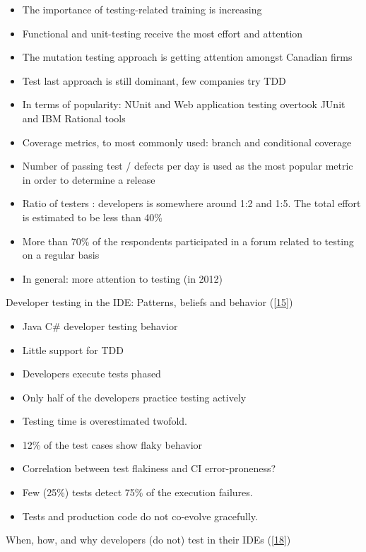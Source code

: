 \documentclass[]{book}
\providecommand{\tightlist}{%
  \setlength{\itemsep}{0pt}\setlength{\parskip}{0pt}}
\begin{document}
\begin{itemize}
\tightlist
\item
  The importance of testing-related training is increasing
\item
  Functional and unit-testing receive the most effort and attention
\item
  The mutation testing approach is getting attention amongst Canadian
  firms
\item
  Test last approach is still dominant, few companies try TDD
\item
  In terms of popularity: NUnit and Web application testing overtook
  JUnit and IBM Rational tools
\item
  Coverage metrics, to most commonly used: branch and conditional
  coverage
\item
  Number of passing test / defects per day is used as the most popular
  metric in order to determine a release
\item
  Ratio of testers : developers is somewhere around 1:2 and 1:5. The
  total effort is estimated to be less than 40\%
\item
  More than 70\% of the respondents participated in a forum related to
  testing on a regular basis
\item
  In general: more attention to testing (in 2012)
\end{itemize}

Developer testing in the IDE: Patterns, beliefs and behavior
({[}\protect\hyperlink{ref-beller2017developer}{15}{]})

\begin{itemize}
\tightlist
\item
  Java C\# developer testing behavior
\item
  Little support for TDD
\item
  Developers execute tests phased
\item
  Only half of the developers practice testing actively
\item
  Testing time is overestimated twofold.
\item
  12\% of the test cases show flaky behavior
\item
  Correlation between test flakiness and CI error-proneness?
\item
  Few (25\%) tests detect 75\% of the execution failures.
\item
  Tests and production code do not co-evolve gracefully.
\end{itemize}

When, how, and why developers (do not) test in their IDEs
({[}\protect\hyperlink{ref-beller2015}{18}{]})
\end{document}

